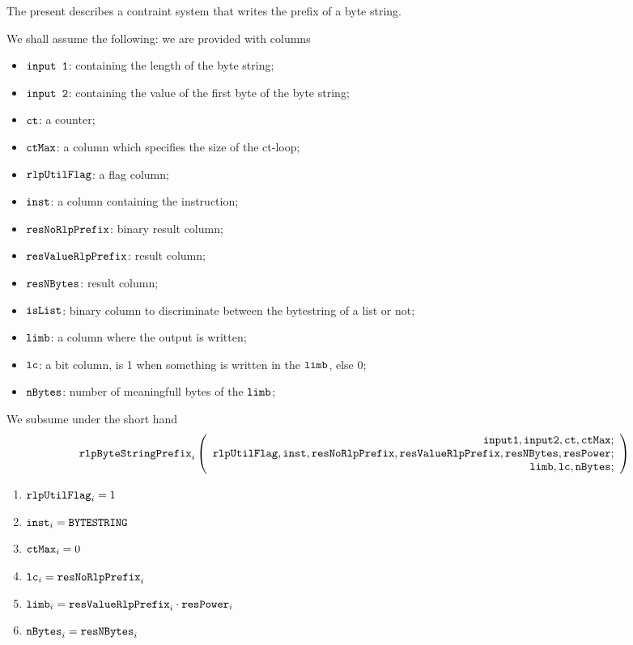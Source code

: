 The present describes a contraint system that writes the \rlp{} prefix of a byte string.

We shall assume the following: we are provided with columns
\begin{itemize}
    \item $\texttt{input 1}$: containing the length of the byte string;
    \item $\texttt{input 2}$: containing the value of the first byte of the byte string;
    \item $\texttt{ct}$: a counter;
    \item $\texttt{ctMax}$: a column which specifies the size of the ct-loop;

    \item $\texttt{rlpUtilFlag}$: a flag column;
    \item $\texttt{inst}$: a column containing the instruction;
    \item $\texttt{resNoRlpPrefix}$: binary result column;
    \item $\texttt{resValueRlpPrefix}$: result column;
    \item $\texttt{resNBytes}$: result column;
    \item $\texttt{isList}$: binary column to discriminate between the bytestring of a list or not;

    \item $\texttt{limb}$: a column where the output is written;
    \item $\texttt{lc}$: a bit column, is 1 when something is written in the $\texttt{limb}$, else 0;
    \item $\texttt{nBytes}$: number of meaningfull bytes of the $\texttt{limb}$;
\end{itemize}

\noindent We subsume under the short hand
\[
    \texttt{rlpByteStringPrefix}_{i}
    \left(
	\begin{array}{r}
    \texttt{input1},
    \texttt{input2},
    \texttt{ct},
    \texttt{ctMax}; \\
    \texttt{rlpUtilFlag},
    \texttt{inst},
    \texttt{resNoRlpPrefix},
    \texttt{resValueRlpPrefix},
    \texttt{resNBytes},
    \texttt{resPower}; \\
    \texttt{limb},
    \texttt{lc},
    \texttt{nBytes}; \\
    \end{array}
	\right)
\]

\begin{enumerate}
    \item $\texttt{rlpUtilFlag}_{i} = 1$
    \item $\texttt{inst}_{i} = \texttt{BYTESTRING}$
    \item $\texttt{ctMax}_{i} = 0$

    \item $\texttt{lc}_{i} = \texttt{resNoRlpPrefix}_{i}$
    \item $\texttt{limb}_{i} = \texttt{resValueRlpPrefix}_{i} \cdot \texttt{resPower}_{i}$
    \item $\texttt{nBytes}_{i} = \texttt{resNBytes}_{i}$
\end{enumerate}
